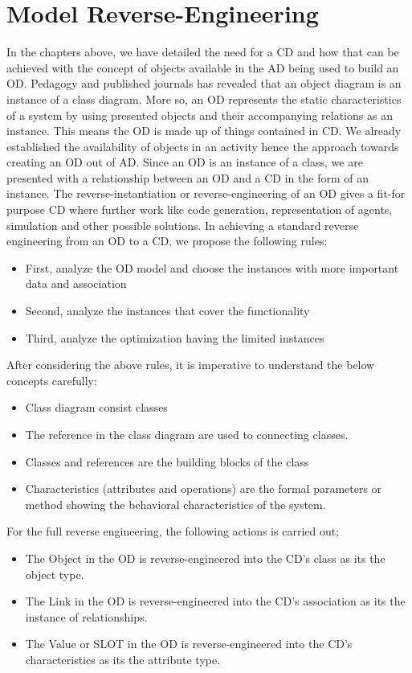 \documentclass[10pt]{article}
\begin{document}
\section{Model Reverse-Engineering}  
In the chapters above, we have detailed the need for a CD and how that can be achieved with the concept of objects available in the AD being used to build an OD. Pedagogy and published journals has revealed that an object diagram is an instance of a class diagram. More so, an OD represents the static characteristics of a system by using presented objects and their accompanying relations as an instance. This means the OD is made up of things contained in CD.
We already established the availability of objects in an activity hence the approach towards creating an OD out of AD. Since an OD is an instance of a class, we are presented with a relationship between an OD and a CD in the form of an instance. The reverse-instantiation or reverse-engineering of an OD gives a fit-for purpose CD where further work like code generation, representation of agents, simulation and other possible solutions. In achieving a standard reverse engineering from an OD to a CD, we propose the following rules:
\begin{itemize}
\item First, analyze the OD model and choose the instances with more important data and association
\item Second, analyze the instances that cover the functionality
\item Third, analyze the optimization having the limited instances
\end{itemize}
After considering the above rules, it is imperative to understand the below concepts carefully:
\begin{itemize}
\item Class diagram consist classes
\item The reference in the class diagram are used to connecting classes.
\item Classes and references are the building blocks of the class
\item Characteristics (attributes and operations) are the formal parameters or method showing the behavioral characteristics of the system.
\end{itemize}
For the full reverse engineering, the following actions is carried out;
\begin{itemize}
\item The Object in the OD is reverse-engineered into the CD's class as its the object type.
\item The Link in the OD is reverse-engineered into the CD's association as its the instance of relationships.
\item The Value or SLOT in the OD is reverse-engineered into the CD's characteristics as its the attribute type.
\end{itemize}
\end{document}
